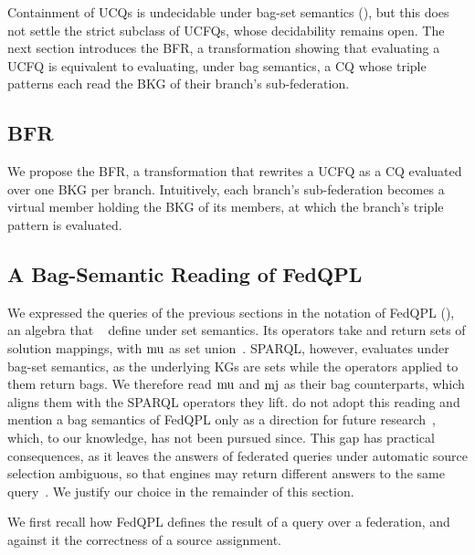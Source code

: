 Containment of \acp{UCQ} is undecidable under bag-set semantics (), but this does not settle the strict subclass of \acp{UCFQ}, whose decidability remains open.
The next section introduces the \ac{BFR}, a transformation showing that evaluating a \ac{UCFQ} is equivalent to evaluating, under bag semantics, a \ac{CQ} whose triple patterns each read the \ac{BKG} of their branch's sub-federation.



\subsection{\acl{BFR}}\label{sec_bag_federation_reduction}

We propose the \ac{BFR}, a transformation that rewrites a \ac{UCFQ} as a \ac{CQ} evaluated over one \ac{BKG} per branch.
Intuitively, each branch's sub-federation becomes a virtual member holding the \ac{BKG} of its members, at which the branch's triple pattern is evaluated.



\subsection{A Bag-Semantic Reading of FedQPL}\label{sec_fedqpl}

We expressed the queries of the previous sections in the notation of FedQPL (), an algebra that \citeauthor{Cheng2021}~\cite{Cheng2021} define under set semantics.
Its operators take and return sets of solution mappings, with $\operatorname{mu}$ as set union~\cite[Def.~6]{Cheng2021}.
SPARQL, however, evaluates under bag-set semantics, as the underlying \acp{KG} are sets while the operators applied to them return bags.
We therefore read $\operatorname{mu}$ and $\operatorname{mj}$ as their bag counterparts, which aligns them with the SPARQL operators they lift.
\citeauthor{Cheng2021} do not adopt this reading and mention a bag semantics of FedQPL only as a direction for future research~\cite{Cheng2021}, which, to our knowledge, has not been pursued since.
This gap has practical consequences, as it leaves the answers of federated queries under automatic source selection ambiguous, so that engines may return different answers to the same query~\cite{tam2026strengthening}.
We justify our choice in the remainder of this section.

We first recall how FedQPL defines the result of a query over a federation, and against it the correctness of a source assignment.

